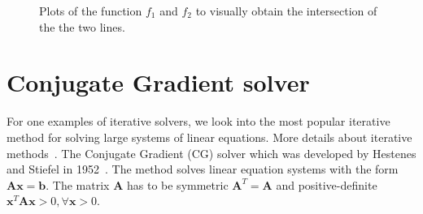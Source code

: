 \documentclass[11pt,fleqn]{book} %
\begin{document}
\begin{figure}[tb]
\centering
{}
\caption{Plots of the function $f_1$ and $f_2$ to visually obtain the intersection of the the two lines.}
\label{fig:example:interesction}
\end{figure}

\section{Conjugate Gradient solver}
For one examples of iterative solvers, we look into the most popular iterative method for solving large systems of linear equations. More details about iterative methods~\cite{olshanskii2014iterative,briggs2000multigrid}. The Conjugate Gradient (CG) solver which was developed by Hestenes and Stiefel in 1952~\cite{hestenes1952methods}. The method solves linear equation systems with the form $\mathbf{A} \mathbf{x} = \mathbf{b}$. The matrix $\mathbf{A}$ has to be symmetric $\mathbf{A}^T = \mathbf{A}$ and positive-definite $\mathbf{x}^T \mathbf{A} \mathbf{x} > 0, \forall \mathbf{x}>0$. \\
\end{document}
